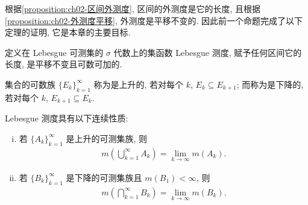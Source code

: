 \documentclass[../../main.tex]{subfiles}
\begin{document}
根据\cref{proposition:ch02-区间外测度}, 区间的外测度是它的长度, 且根据\cref{proposition:ch02-外测度平移}, 外测度是平移不变的. 因此前一个命题完成了以下定理的证明, 它是本章的主要目标.

\begin{theorem}\label{theorem:ch02-测度定理}
定义在 Lebesgue 可测集的 $\sigma$ 代数上的集函数 Lebesgue 测度, 赋予任何区间它的长度, 是平移不变且可数可加的.
\end{theorem}

集合的可数族 $\{E_{k}\}_{k=1}^{\infty}$ 称为是上升的, 若对每个 $k$, $E_{k}\subseteq E_{k+1}$; 而称为是下降的, 若对每个 $k$, $E_{k+1}\subseteq E_{k}$.

\begin{theorem}[测度的连续性]\label{theorem:ch02-测度连续}
Lebesgue 测度具有以下连续性质:
\begin{enumerate}[(i)]
\item 若 $\{A_{k}\}_{k=1}^{\infty}$ 是上升的可测集族, 则
\begin{align}
m\left(\bigcup_{k=1}^{\infty}A_{k}\right)=\lim_{k\to\infty}m(A_{k}).\label{align:ch02-上升连续}
\end{align}
\item 若 $\{B_{k}\}_{k=1}^{\infty}$ 是下降的可测集族且 $m(B_{1})<\infty$, 则
\begin{align}
m\left(\bigcap_{k=1}^{\infty}B_{k}\right)=\lim_{k\to\infty}m(B_{k}).\label{align:ch02-下降连续}
\end{align}
\end{enumerate}
\end{theorem}
\end{document}
